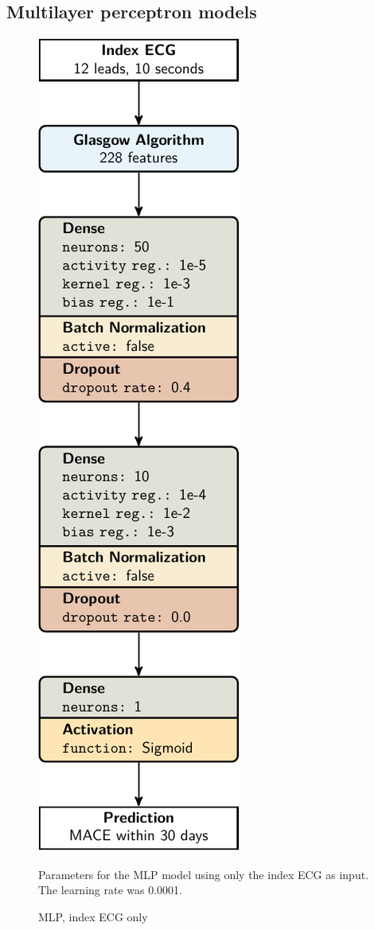 \documentclass[preprint]{elsarticle}
\begin{document}
\subsection{Multilayer perceptron models}
\begin{figure}[H]
\centering
\includegraphics[scale=\modelscale,keepaspectratio]{figures/model-mlp1.pdf}
\caption{MLP, index ECG only}
\medskip
\small
Parameters for the MLP model using only the index ECG as input. The learning rate was 0.0001.
\end{figure}
\end{document}
